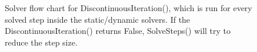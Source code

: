 \begin{figure}
  \caption{Solver flow chart for DiscontinuousIteration(), which is run for every solved step inside the static/dynamic solvers. If the DiscontinuousIteration() returns False, 
	SolveSteps() will try to reduce the step size.}
	\label{fig_solver_discontinuous_iteration}
\end{figure}


